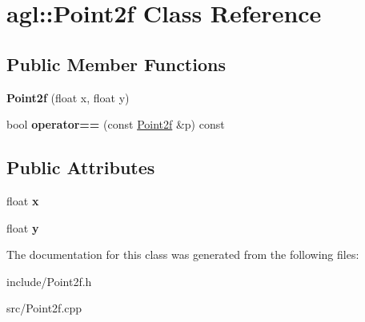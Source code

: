 \hypertarget{classagl_1_1Point2f}{}\section{agl\+::Point2f Class Reference}
\label{classagl_1_1Point2f}
\subsection*{Public Member Functions}
\begin{DoxyCompactItemize}
\item 
\mbox{\label{classagl_1_1Point2f_a9d51efce72170f552f54e56e610689ac}} 
{\bfseries Point2f} (float x, float y)
\item 
\mbox{\label{classagl_1_1Point2f_a5abb9122654e41e1016b00d87e4e3b6d}} 
bool {\bfseries operator==} (const \mbox{\hyperlink{classagl_1_1Point2f}{Point2f}} \&p) const
\end{DoxyCompactItemize}
\subsection*{Public Attributes}
\begin{DoxyCompactItemize}
\item 
\mbox{\label{classagl_1_1Point2f_ab407435a55c0b0abbb18bd64608953f5}} 
float {\bfseries x}
\item 
\mbox{\label{classagl_1_1Point2f_ade1d06467e556d0dbb53925b4191e08b}} 
float {\bfseries y}
\end{DoxyCompactItemize}


The documentation for this class was generated from the following files\+:\begin{DoxyCompactItemize}
\item 
include/Point2f.\+h\item 
src/Point2f.\+cpp\end{DoxyCompactItemize}

